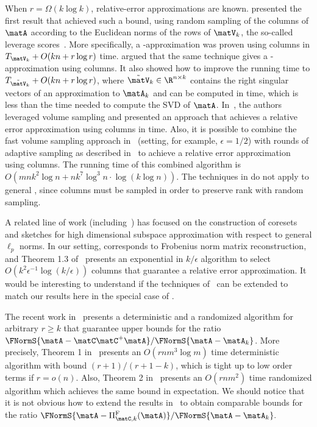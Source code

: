 When $r=\Omega(k\log k)$, relative-error approximations are known.
\cite{DMM06b} presented the first result that achieved such a bound, using random sampling of the columns of $\matA$ according to the Euclidean norms of the rows of $\matV_k$, the so-called leverage scores~\cite{MD09}. More specifically, a -approximation was proven using  columns in $T_{\matV_k} + O(kn+r\log r)$ time. \cite{Sar06} argued
that the same technique gives a -approximation
using  columns. It also  showed how to improve the running time to $T_{\tilde{\matV}_k} +
O(kn+r\log r)$, where $\tilde{\matV}_k \in \R^{n \times k}$ contains the right singular vectors of an approximation to $\matA_k$ and can be computed in
 time, which is less than the time needed to compute the SVD of $\matA$.
In~\cite{DV06}, the authors leveraged volume sampling and presented an approach that achieves a relative error approximation using  columns in  time. Also, it is possible to combine the fast volume sampling approach in~\cite{DR10} (setting, for example, $\epsilon=1/2$) with  rounds of adaptive sampling as described in~\cite{DV06} to achieve a relative error approximation using  columns. The running time of this combined algorithm is $O\left(mnk^2 \log n + nk^7 \log^{3} n\cdot \log\left(k \log n\right)\right)$.
The techniques in \cite{DMM06b} do not apply to general , since  columns must be sampled in order to preserve rank with random sampling.

A related line of work (including~\cite{DV07,FL11, FMSW10,SV07})
has focused on the construction of coresets and
sketches for high dimensional subspace approximation with respect
to general $\ell_p$ norms. In our setting,  corresponds to
Frobenius norm matrix reconstruction, and Theorem 1.3 of~\cite{SV07}
presents an exponential in $k/\epsilon$ algorithm to select
 $O\left(k^2\epsilon^{-1} \log\left(k/\epsilon\right)\right)$ columns that
guarantee a relative error approximation. It would be interesting to
understand if the techniques of~\cite{DV07,FL11, FMSW10,SV07}
can be extended to match our results here in the special case
of .

The recent work in~\cite{GS2011} presents a deterministic and a randomized algorithm for arbitrary
$r \ge k$ that guarantee upper bounds for the ratio $ \FNormS{\matA - \matC \matC^+ \matA} / \FNormS{\matA - \matA_k}$.
More precisely, Theorem 1 in~\cite{GS2011} presents an $O\left(rnm^3 \log m \right)$ time deterministic algorithm with bound $(r+1)/(r+1-k)$, which is tight up to
low order terms if $r = o(n)$. Also, Theorem 2 in~\cite{GS2011} presents an $O(rnm^2)$ time randomized algorithm
which achieves the same bound in expectation. We should notice that it is not obvious how to
extend the results in~\cite{GS2011} to obtain comparable bounds for the ratio
$\FNormS{\matA-\Pi_{\matC,k}^{\mathrm{F}}(\matA)} / \FNormS{\matA-\matA_k}.$


